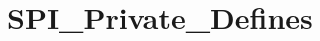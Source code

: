 \hypertarget{group___s_p_i___private___defines}{\section{S\-P\-I\-\_\-\-Private\-\_\-\-Defines}
\label{group___s_p_i___private___defines}
}
